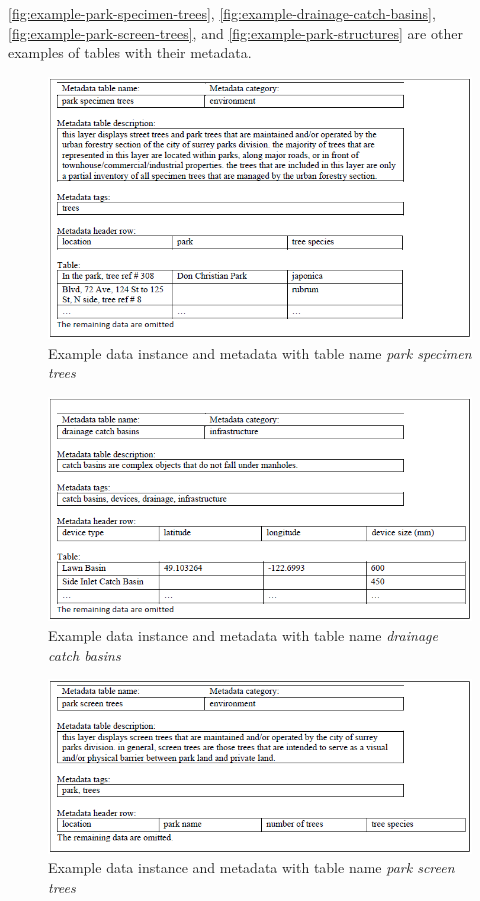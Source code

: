 \autoref{fig:example-park-specimen-trees}, \autoref{fig:example-drainage-catch-basins}, \autoref{fig:example-park-screen-trees}, and \autoref{fig:example-park-structures} are other examples of tables with their metadata.

\begin{figure}
    \centering
    \includegraphics[width=5in]{figures/example-park-specimen-trees.png}
    \caption{Example data instance and metadata with table name \textit{park specimen trees}}
    \label{fig:example-park-specimen-trees}
\end{figure}

\begin{figure}
    \centering
    \includegraphics[width=5in]{figures/example-drainage-catch-basins.png}
    \caption{Example data instance and metadata with table name \textit{drainage catch basins}}
    \label{fig:example-drainage-catch-basins}
\end{figure}

\begin{figure}
    \centering
    \includegraphics[width=5in]{figures/example-park-screen-trees.png}
    \caption{Example data instance and metadata with table name \textit{park screen trees}}
    \label{fig:example-park-screen-trees}
\end{figure}

